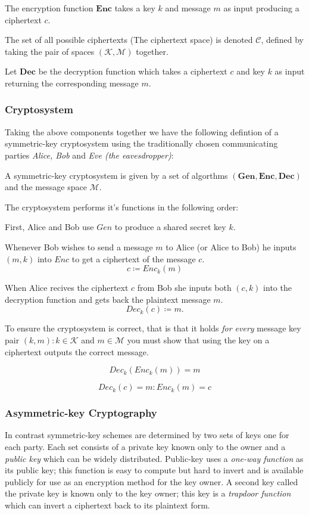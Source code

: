 The encryption function $\mathbf{{Enc}}$ takes a key $k$ and message $m$ as input producing a ciphertext $c$.


The set of all possible ciphertexts (The ciphertext space) is denoted $\mathbf{\mathcal{C}}$, defined by taking the pair of spaces $\mathbf{(\mathcal{K}, \mathcal{M})}$ together. 


Let $\mathbf{Dec}$ be the decryption function which takes a ciphertext $c$ and key $k$ as input returning the corresponding message $m$.


\subsubsection*{Cryptosystem}


Taking the above components together we have the following defintion of a symmetric-key cryptosystem using the traditionally chosen communicating parties \emph{Alice, Bob} and \emph{Eve (the eavesdropper)}:


A symmetric-key cryptosystem is given by a set of algorthms $\mathbf{(Gen, Enc, Dec)}$ and the message space $\mathcal{M}$.

The cryptosystem performs it's functions in the following order:

First, Alice and Bob use $Gen$ to produce a shared secret key $k$.

Whenever Bob wishes to send a message $m$ to Alice (or Alice to Bob) he inputs $(m,k)$ into $Enc$ to get a ciphertext of the message $c$.
\[c \coloneqq Enc_{k}(m)\]

When Alice recives the ciphertext $c$ from Bob she inputs both $(c,k)$ into the decryption function and gets back the plaintext message $m$.
\[Dec_{k}(c) \coloneqq m.\]

To ensure the cryptosystem is correct, that is that it holds \textit{for every} message key pair $(k,m) : k \in \mathcal{K}$ and $m \in \mathcal{M}$ you must show that using the key on a ciphertext outputs the correct message. 

\[Dec_{k}(Enc_{k}(m)) = m\]

\[Dec_{k}(c) = m : Enc_{k}(m) = c\]



\subsubsection{Asymmetric-key Cryptography}
In contrast symmetric-key schemes are determined by two sets of keys one for each party. Each set consists of a private key known only to the owner and a \emph{public key} which can be widely distributed.
Public-key uses a \emph{one-way function} as its public key; this function is easy to compute but hard to invert and is available publicly for use as an encryption method for the key owner. A second key called the private key is known only to the key owner; this key is a \emph{trapdoor function} which can invert a ciphertext back to its plaintext form.

